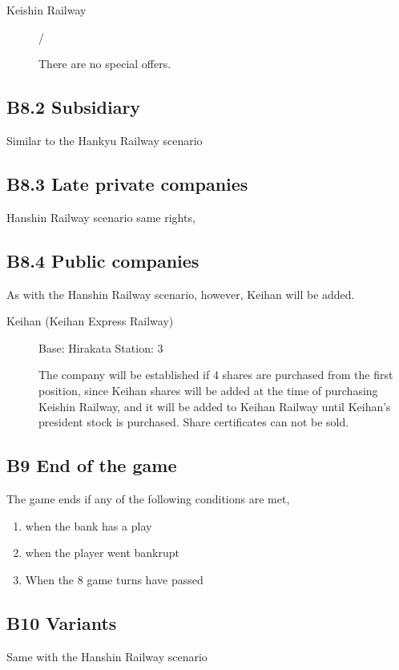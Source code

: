 \documentclass{article}
\begin{document}
\begin{CJK}{UTF8}{min}
\begin{description}
\item[Keishin Railway]  / 

There are no special offers.
\end{description}

\subsection*{B8.2 Subsidiary}
Similar to the Hankyu Railway scenario

\subsection*{B8.3 Late private companies}
Hanshin Railway scenario same rights,

\subsection*{B8.4 Public companies}
As with the Hanshin Railway scenario, however, Keihan will be added.

\begin{description}
\item[Keihan (Keihan Express Railway)] Base: Hirakata Station: 3

The company will be established if 4 shares are purchased from the
first position, since Keihan shares will be added at the time of
purchasing Keishin Railway, and it will be added to Keihan Railway
until Keihan's president stock is purchased. Share certificates can
not be sold.
\end{description}

\subsection*{B9 End of the game}
The game ends if any of the following conditions are met,
\begin{enumerate}
\item when the bank has a play
\item when the player went bankrupt
\item When the 8 game turns have passed
\end{enumerate}

\subsection*{B10 Variants}
Same with the Hanshin Railway scenario



\end{CJK}
\end{document}
